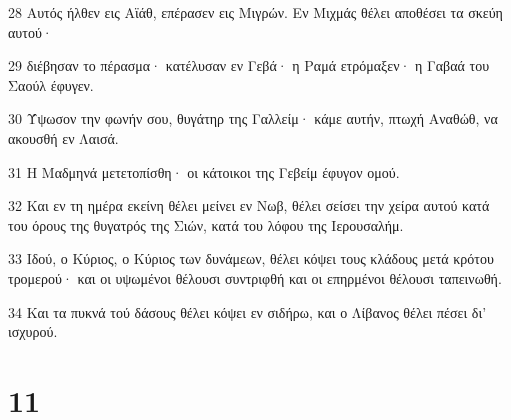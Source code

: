 \par 28 Αυτός ήλθεν εις Αϊάθ, επέρασεν εις Μιγρών. Εν Μιχμάς θέλει αποθέσει τα σκεύη αυτού·
\par 29 διέβησαν το πέρασμα· κατέλυσαν εν Γεβά· η Ραμά ετρόμαξεν· η Γαβαά του Σαούλ έφυγεν.
\par 30 Ύψωσον την φωνήν σου, θυγάτηρ της Γαλλείμ· κάμε αυτήν, πτωχή Αναθώθ, να ακουσθή εν Λαισά.
\par 31 Η Μαδμηνά μετετοπίσθη· οι κάτοικοι της Γεβείμ έφυγον ομού.
\par 32 Και εν τη ημέρα εκείνη θέλει μείνει εν Νωβ, θέλει σείσει την χείρα αυτού κατά του όρους της θυγατρός της Σιών, κατά του λόφου της Ιερουσαλήμ.
\par 33 Ιδού, ο Κύριος, ο Κύριος των δυνάμεων, θέλει κόψει τους κλάδους μετά κρότου τρομερού· και οι υψωμένοι θέλουσι συντριφθή και οι επηρμένοι θέλουσι ταπεινωθή.
\par 34 Και τα πυκνά τού δάσους θέλει κόψει εν σιδήρω, και ο Λίβανος θέλει πέσει δι' ισχυρού.

\chapter{11}

